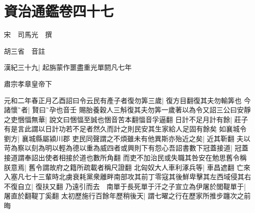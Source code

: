 \section{資治通鑑卷四十七}
宋　司馬光　撰

胡三省　音註

漢紀三十九|{
	起旃蒙作噩盡重光單閼凡七年}


肅宗孝章皇帝下

元和二年春正月乙酉詔曰令云民有產子者復勿筭三歲|{
	復方目翻復其夫勿輸筭也}
今諸懷者|{
	賢曰孕也音壬}
賜胎養穀人三斛復其夫勿筭一歲著以為令又詔三公曰安靜之吏悃愊無華|{
	說文曰悃愊至誠也悃音苦本翻愊音孚逼翻}
日計不足月計有餘|{
	莊子有是言此謂以日計功若不足者然久而計之則民安其生家給人足固有餘矣}
如襄城令劉方|{
	襄城縣屬潁川郡}
吏民同聲謂之不煩雖未有他異斯亦殆近之矣|{
	近其靳翻}
夫以苛為察以刻為明以輕為德以重為威四者或興則下有怨心吾詔書數下冠蓋接道|{
	冠蓋接道謂奉詔出使者相接於道也數所角翻}
而吏不加治民或失職其咎安在勉思舊令稱朕意焉|{
	舊令謂故府之籍所疏載者稱尺證翻}
北匈奴大人車利涿兵等|{
	車昌遮翻}
亡來入塞凡七十三輩時北虜衰耗黨衆離畔南部攻其前丁零寇其後鮮卑擊其左西域侵其右不復自立|{
	復扶又翻}
乃遠引而去　南單于長死單于汗之子宣立為伊屠於閭鞮單于|{
	屠直於翻鞮丁奚翻}
太初歷施行百餘年歷稍後天|{
	謂七曜之行在歷家所推步躔次之前晦}


